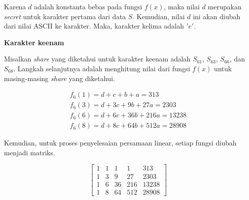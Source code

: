 Karena \begin{math}d\end{math} adalah konstanta bebas pada fungsi \begin{math}f(x)\end{math}, maka nilai \begin{math}d\end{math} merupakan \textit{secret} untuk karakter pertama dari data \begin{math}S\end{math}. Kemudian, nilai \begin{math}d\end{math} ini akan diubah dari nilai ASCII ke karakter. Maka, karakter kelima adalah \begin{math}'e'\end{math}.

\begin{flushleft}
	\textbf{Karakter keenam}
\end{flushleft}

Misalkan \textit{share} yang diketahui untuk karakter keenam adalah \begin{math}S_{61}\end{math}, \begin{math}S_{63}\end{math}, \begin{math}S_{66}\end{math}, dan \begin{math}S_{68}\end{math}. Langkah selanjutnya adalah menghitung nilai dari fungsi \begin{math}f(x)\end{math} untuk masing-masing \textit{share} yang diketahui.

\begin{gather*}
	f_6(1) = d + c + b + a = 313 \\
	f_6(3) = d + 3c + 9b + 27a = 2303 \\
	f_6(6) = d + 6c + 36b + 216a = 13238 \\
	f_6(8) = d + 8c + 64b + 512a = 28908
\end{gather*}

Kemudian, untuk proses penyelesaian persamaan linear, setiap fungsi diubah menjadi matriks.

\begin{center}
	\setlength\arraycolsep{15pt}
	\[
	\begin{bmatrix}
			1 	& 1 	& 1 	& 1 		& 313 		\\[1em]
			1 	& 3 	& 9 	& 27 		& 2303		\\[1em]
			1 	& 6 	& 36 	& 216 	& 13238		\\[1em]
			1 	& 8 	& 64 	& 512 	& 28908
	\end{bmatrix}
	\]
\end{center}


